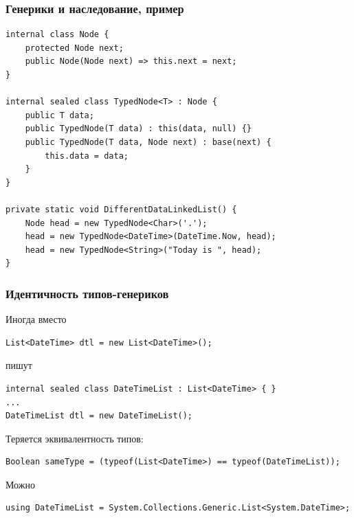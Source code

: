 \documentclass[xetex,mathserif,serif]{beamer}
\begin{document}
	\begin{frame}[fragile]
		\frametitle{Генерики и наследование, пример}
		\begin{footnotesize}
			\begin{verbatim}
internal class Node {
    protected Node next;
    public Node(Node next) => this.next = next;
}

internal sealed class TypedNode<T> : Node {
    public T data;
    public TypedNode(T data) : this(data, null) {}
    public TypedNode(T data, Node next) : base(next) {
        this.data = data;
    }
}

private static void DifferentDataLinkedList() {
    Node head = new TypedNode<Char>('.');
    head = new TypedNode<DateTime>(DateTime.Now, head);
    head = new TypedNode<String>("Today is ", head);
}
			\end{verbatim}
		\end{footnotesize}
	\end{frame}

	\begin{frame}[fragile]
		\frametitle{Идентичность типов-генериков}
		Иногда вместо
		\begin{footnotesize}
			\begin{verbatim}
List<DateTime> dtl = new List<DateTime>();
			\end{verbatim}
		\end{footnotesize}
		пишут
		\begin{footnotesize}
			\begin{verbatim}
internal sealed class DateTimeList : List<DateTime> { }
...
DateTimeList dtl = new DateTimeList();
			\end{verbatim}
		\end{footnotesize}
		\vspace{5mm}
		Теряется эквивалентность типов:
		\begin{footnotesize}
			\begin{verbatim}
Boolean sameType = (typeof(List<DateTime>) == typeof(DateTimeList));
			\end{verbatim}
		\end{footnotesize}
		\vspace{5mm}
		Можно
		\begin{footnotesize}
			\begin{verbatim}
using DateTimeList = System.Collections.Generic.List<System.DateTime>;
			\end{verbatim}
		\end{footnotesize}
	\end{frame}
\end{document}
